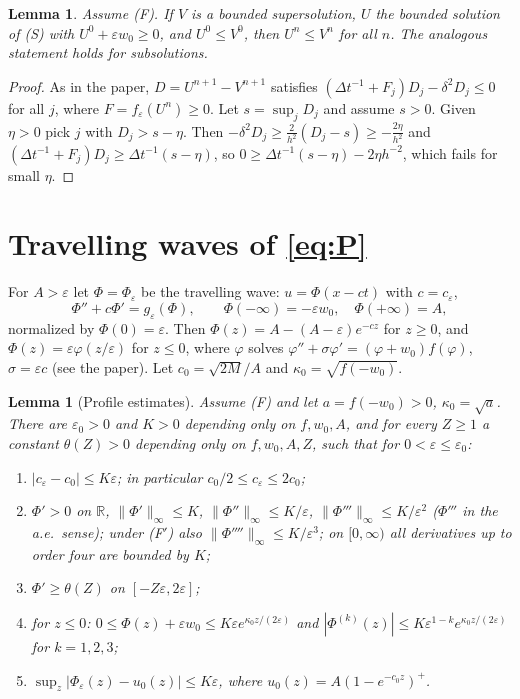 \documentclass[11pt]{amsart}
\newtheorem{lemma}[theorem]{Lemma}
\theoremstyle{remark}
\newcommand{\ve}{\varepsilon}
\newcommand{\R}{\mathbb{R}}
\begin{document}
\begin{lemma}\label{lem:comp}
Assume (F). If $V$ is a bounded supersolution, $U$ the bounded solution of (S)
with $U^0+\ve w_0\ge0$, and $U^0\le V^0$, then $U^n\le V^n$ for all $n$. The
analogous statement holds for subsolutions.
\end{lemma}

\begin{proof}
As in the paper, $D=U^{n+1}-V^{n+1}$ satisfies
$(\Delta t^{-1}+F_j)D_j-\delta^2D_j\le0$ for all $j$, where
$F=f_\ve(U^n)\ge0$. Let $s=\sup_jD_j$ and assume $s>0$. Given $\eta>0$ pick $j$
with $D_j>s-\eta$. Then $-\delta^2D_j\ge\frac{2}{h^2}(D_j-s)\ge-\frac{2\eta}{h^2}$
and $(\Delta t^{-1}+F_j)D_j\ge\Delta t^{-1}(s-\eta)$, so
$0\ge\Delta t^{-1}(s-\eta)-2\eta h^{-2}$, which fails for small $\eta$.
\end{proof}

\section{Travelling waves of \eqref{eq:P}}

For $A>\ve$ let $\Phi=\Phi_\ve$ be the travelling wave: $u=\Phi(x-ct)$ with
$c=c_\ve$,
\begin{equation}\label{eq:tw}
\Phi''+c\Phi'=g_\ve(\Phi),\qquad \Phi(-\infty)=-\ve w_0,\quad\Phi(+\infty)=A,
\end{equation}
normalized by $\Phi(0)=\ve$. Then $\Phi(z)=A-(A-\ve)e^{-cz}$ for $z\ge0$, and
$\Phi(z)=\ve\varphi(z/\ve)$ for $z\le0$, where $\varphi$ solves
$\varphi''+\sigma\varphi'=(\varphi+w_0)f(\varphi)$, $\sigma=\ve c$ (see the
paper). Let $c_0=\sqrt{2M}/A$ and $\kappa_0=\sqrt{f(-w_0)}$.

\begin{lemma}[Profile estimates]\label{lem:profile}
Assume (F) and let $a=f(-w_0)>0$, $\kappa_0=\sqrt a$. There are $\ve_0>0$ and
$K>0$ depending only on $f,w_0,A$, and for every $Z\ge1$ a constant
$\theta(Z)>0$ depending only on $f,w_0,A,Z$, such that for $0<\ve\le\ve_0$:
\begin{enumerate}
\item $|c_\ve-c_0|\le K\ve$; in particular $c_0/2\le c_\ve\le 2c_0$;
\item $\Phi'>0$ on $\R$, $\|\Phi'\|_\infty\le K$, $\|\Phi''\|_\infty\le K/\ve$,
$\|\Phi'''\|_\infty\le K/\ve^2$ ($\Phi'''$ in the a.e.\ sense); under (F$'$)
also $\|\Phi''''\|_\infty\le K/\ve^3$; on $[0,\infty)$ all derivatives up to
order four are bounded by $K$;
\item $\Phi'\ge\theta(Z)$ on $[-Z\ve,2\ve]$;
\item for $z\le0$: $0\le\Phi(z)+\ve w_0\le K\ve e^{\kappa_0 z/(2\ve)}$ and
$|\Phi^{(k)}(z)|\le K\ve^{1-k}e^{\kappa_0 z/(2\ve)}$ for $k=1,2,3$;
\item $\sup_z|\Phi_\ve(z)-u_0(z)|\le K\ve$, where $u_0(z)=A(1-e^{-c_0z})^+$.
\end{enumerate}
\end{lemma}
\end{document}
